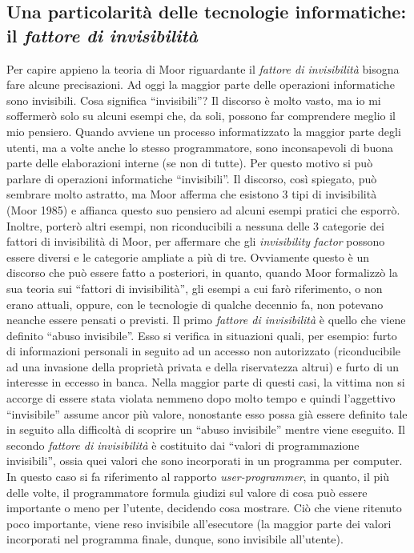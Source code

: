 \subsection*{Una particolarità delle tecnologie informatiche: il \textit{fattore di invisibilità}}

Per capire appieno la teoria di Moor riguardante il \textit{fattore di invisibilità} bisogna fare alcune precisazioni. Ad oggi la maggior parte delle operazioni informatiche sono invisibili. Cosa significa “invisibili”? 
Il discorso è molto vasto, ma io mi soffermerò solo su alcuni esempi che, da soli, possono far comprendere meglio il mio pensiero. 
Quando avviene un processo informatizzato la maggior parte degli utenti, ma a volte anche lo stesso programmatore, sono inconsapevoli di buona parte delle elaborazioni interne (se non di tutte). Per questo motivo si può parlare di operazioni informatiche “invisibili”.
Il discorso, così spiegato, può sembrare molto astratto, ma Moor afferma che esistono 3 tipi di invisibilità (Moor 1985) e affianca questo suo pensiero ad alcuni esempi pratici che esporrò. Inoltre, porterò altri esempi, non riconducibili a nessuna delle 3 categorie dei fattori di invisibilità di Moor, per affermare che gli \textit{invisibility factor} possono essere diversi e le categorie ampliate a più di tre. Ovviamente questo è un discorso che può essere fatto a posteriori, in quanto, quando Moor formalizzò la sua teoria sui “fattori di invisibilità”, gli esempi a cui farò riferimento, o non erano attuali, oppure, con le tecnologie di qualche decennio fa, non potevano neanche essere pensati o previsti.
Il primo \textit{fattore di invisibilità} è quello che viene definito “abuso invisibile”. Esso si verifica in situazioni quali, per esempio: furto di informazioni personali in seguito ad un accesso non autorizzato (riconducibile ad una invasione della proprietà privata e della riservatezza altrui) e furto di un interesse in eccesso in banca. Nella maggior parte di questi casi, la vittima non si accorge di essere stata violata nemmeno dopo molto tempo e quindi l’aggettivo “invisibile” assume ancor più valore, nonostante esso possa già essere definito tale in seguito alla difficoltà di scoprire un “abuso invisibile” mentre viene eseguito.
Il secondo \textit{fattore di invisibilità} è costituito dai “valori di programmazione invisibili”, ossia quei valori che sono incorporati in un programma per computer. In questo caso si fa riferimento al rapporto \textit{user-programmer}, in quanto, il più delle volte, il programmatore formula giudizi sul valore di cosa può essere importante o meno per l’utente, decidendo cosa mostrare. Ciò che viene ritenuto poco importante, viene reso invisibile all’esecutore (la maggior parte dei valori incorporati nel programma finale, dunque, sono invisibile all’utente).

